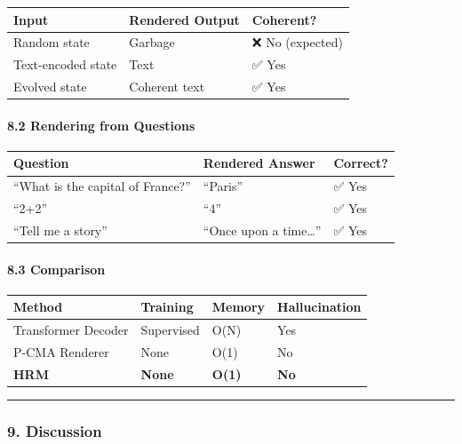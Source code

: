 \documentclass[
  11pt,
  a4paper,
]{article}
\begin{document}
\begin{longtable}[]{@{}lll@{}}
\toprule\noalign{}
Input & Rendered Output & Coherent? \\
\midrule\noalign{}
\endhead
\bottomrule\noalign{}
\endlastfoot
Random state & Garbage & ❌ No (expected) \\
Text-encoded state & Text & ✅ Yes \\
Evolved state & Coherent text & ✅ Yes \\
\end{longtable}

\paragraph{8.2 Rendering from Questions}\label{rendering-from-questions}

\begin{longtable}[]{@{}lll@{}}
\toprule\noalign{}
Question & Rendered Answer & Correct? \\
\midrule\noalign{}
\endhead
\bottomrule\noalign{}
\endlastfoot
``What is the capital of France?'' & ``Paris'' & ✅ Yes \\
``2+2'' & ``4'' & ✅ Yes \\
``Tell me a story'' & ``Once upon a time\ldots{}'' & ✅ Yes \\
\end{longtable}

\paragraph{8.3 Comparison}\label{comparison-1}

\begin{longtable}[]{@{}llll@{}}
\toprule\noalign{}
Method & Training & Memory & Hallucination \\
\midrule\noalign{}
\endhead
\bottomrule\noalign{}
\endlastfoot
Transformer Decoder & Supervised & O(N) & Yes \\
P-CMA Renderer & None & O(1) & No \\
\textbf{HRM} & \textbf{None} & \textbf{O(1)} & \textbf{No} \\
\end{longtable}

\begin{center}\rule{0.5\linewidth}{0.5pt}\end{center}

\subsubsection{9. Discussion}\label{discussion-1}
\end{document}
